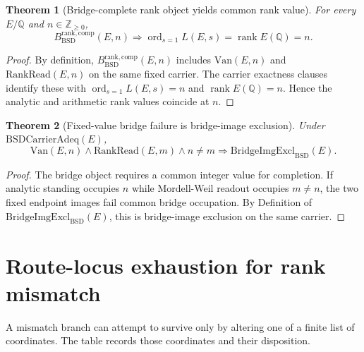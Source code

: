 \documentclass[11pt]{article}
\newtheorem{theorem}{Theorem}[section]
\newcommand{\Q}{\mathbb{Q}}
\newcommand{\Z}{\mathbb{Z}}
\newcommand{\rank}{\operatorname{rank}}
\newcommand{\ord}{\operatorname{ord}}
\newcommand{\BSD}{\mathrm{BSD}}
\newcommand{\Van}{\mathrm{Van}}
\newcommand{\RankRead}{\mathrm{RankRead}}
\newcommand{\BridgeImgExcl}{\mathrm{BridgeImgExcl}_{\BSD}}
\newcommand{\BsdRankBridgeComp}{B^{\mathrm{rank,comp}}_{\BSD}}
\begin{document}
\begin{theorem}[Bridge-complete rank object yields common rank value]\label{thm:bridge-complete-yields-rank-value}
For every $E/\Q$ and $n\in\Z_{\ge0}$,
\[
\BsdRankBridgeComp(E,n)
\Rightarrow
\ord_{s=1}L(E,s)=\rank E(\Q)=n.
\]
\end{theorem}

\begin{proof}
By definition, $\BsdRankBridgeComp(E,n)$ includes $\Van(E,n)$ and $\RankRead(E,n)$ on the same fixed carrier. The carrier exactness clauses identify these with $\ord_{s=1}L(E,s)=n$ and $\rank E(\Q)=n$. Hence the analytic and arithmetic rank values coincide at $n$.
\end{proof}

\begin{theorem}[Fixed-value bridge failure is bridge-image exclusion]\label{thm:fixed-value-bridge-failure}
Under $\mathrm{BSDCarrierAdeq}(E)$,
\[
\Van(E,n)\wedge \RankRead(E,m)\wedge n\neq m
\Rightarrow
\BridgeImgExcl(E).
\]
\end{theorem}

\begin{proof}
The bridge object requires a common integer value for completion. If analytic standing occupies $n$ while Mordell-Weil readout occupies $m\neq n$, the two fixed endpoint images fail common bridge occupation. By Definition of $\BridgeImgExcl(E)$, this is bridge-image exclusion on the same carrier.
\end{proof}

\section{Route-locus exhaustion for rank mismatch}

A mismatch branch can attempt to survive only by altering one of a finite list of coordinates. The table records those coordinates and their disposition.
\end{document}
